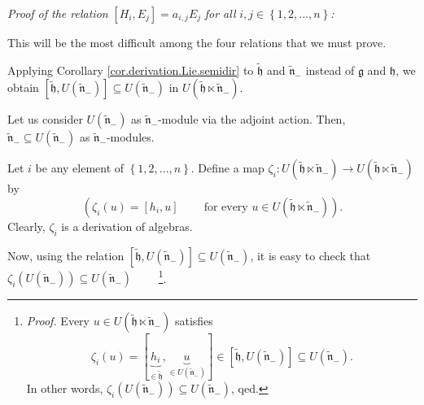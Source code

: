 \documentclass[etingof-lie.tex]{subfiles}
\begin{document}
\textit{Proof of the relation }$\left[  H_{i},E_{j}\right]  =a_{i,j}E_{j}$
\textit{for all } $i,j\in\left\{  1,2,...,n\right\}  $\textit{:}

This will be the most difficult among the four relations that we must prove.

Applying Corollary \ref{cor.derivation.Lie.semidir} to
$\widetilde{\mathfrak{h}}$ and $\widetilde{\mathfrak{n}}_{-}$ instead of
$\mathfrak{g}$ and $\mathfrak{h}$, we obtain $\left[  \widetilde{\mathfrak{h}%
},U\left(  \widetilde{\mathfrak{n}}_{-}\right)  \right]  \subseteq U\left(
\widetilde{\mathfrak{n}}_{-}\right)  $ in $U\left(  \widetilde{\mathfrak{h}%
}\ltimes\widetilde{\mathfrak{n}}_{-}\right)  $.

Let us consider $U\left(  \widetilde{\mathfrak{n}}_{-}\right)  $ as
$\widetilde{\mathfrak{n}}_{-}$-module via the adjoint action. Then,
$\widetilde{\mathfrak{n}}_{-}\subseteq U\left(  \widetilde{\mathfrak{n}}%
_{-}\right)  $ as $\widetilde{\mathfrak{n}}_{-}$-modules.

Let $i$ be any element of $\left\{  1,2,...,n\right\}  $. Define a map
$\zeta_{i}:U\left(  \widetilde{\mathfrak{h}}\ltimes\widetilde{\mathfrak{n}%
}_{-}\right)  \rightarrow U\left(  \widetilde{\mathfrak{h}}\ltimes
\widetilde{\mathfrak{n}}_{-}\right)  $ by%
\[
\left(  \zeta_{i}\left(  u\right)  =\left[  h_{i},u\right]
\ \ \ \ \ \ \ \ \ \ \text{for every }u\in U\left(  \widetilde{\mathfrak{h}%
}\ltimes\widetilde{\mathfrak{n}}_{-}\right)  \right)  .
\]
Clearly, $\zeta_{i}$ is a derivation of algebras.

Now, using the relation $\left[  \widetilde{\mathfrak{h}},U\left(
\widetilde{\mathfrak{n}}_{-}\right)  \right]  \subseteq U\left(
\widetilde{\mathfrak{n}}_{-}\right)  $, it is easy to check that $\zeta
_{i}\left(  U\left(  \widetilde{\mathfrak{n}}_{-}\right)  \right)  \subseteq
U\left(  \widetilde{\mathfrak{n}}_{-}\right)  $%
\ \ \ \ \footnote{\textit{Proof.} Every $u\in U\left(  \widetilde{\mathfrak{h}%
}\ltimes\widetilde{\mathfrak{n}}_{-}\right)  $ satisfies%
\[
\zeta_{i}\left(  u\right)  =\left[  \underbrace{h_{i}}_{\in
\widetilde{\mathfrak{h}}},\underbrace{u}_{\in U\left(  \widetilde{\mathfrak{n}%
}_{-}\right)  }\right]  \in\left[  \widetilde{\mathfrak{h}},U\left(
\widetilde{\mathfrak{n}}_{-}\right)  \right]  \subseteq U\left(
\widetilde{\mathfrak{n}}_{-}\right)  .
\]
In other words, $\zeta_{i}\left(  U\left(  \widetilde{\mathfrak{n}}%
_{-}\right)  \right)  \subseteq U\left(  \widetilde{\mathfrak{n}}_{-}\right)
$, qed.}.
\end{document}

